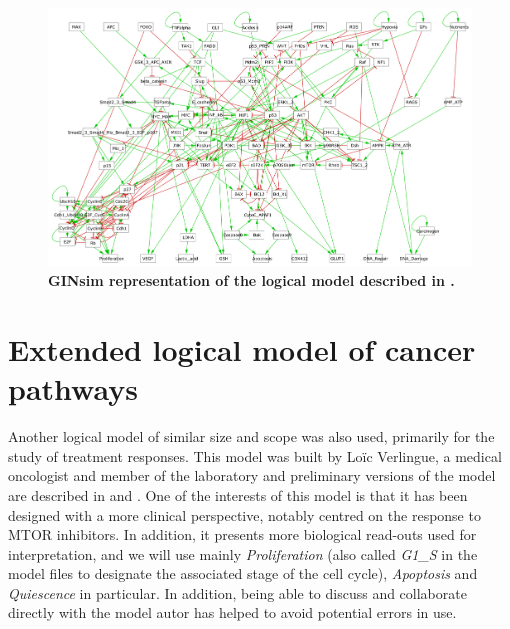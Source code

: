 \documentclass[a4paper,12pt,twoside,onecolumn,openright,final,oldfontcommands]{memoir}
\begin{document}
\begin{figure}

{\centering \includegraphics[width=0.9\linewidth]{fig/Fumia2013} 

}

\caption[GINsim representation of the logical model described in Fumia et al. (2013)]{\textbf{GINsim representation of the logical model
described in \citet{fumia2013boolean}.}}\label{fig:Fumia}
\end{figure}




\section{Extended logical model of cancer
pathways}\label{appendix-verlingue}

Another logical model of similar size and scope was also used, primarily
for the study of treatment responses. This model was built by Loïc
Verlingue, a medical oncologist and member of the laboratory and
preliminary versions of the model are described in
\citet{verlingue2016comprehensive} and \citet{verlingue2016silico}. One
of the interests of this model is that it has been designed with a more
clinical perspective, notably centred on the response to MTOR
inhibitors. In addition, it presents more biological read-outs used for
interpretation, and we will use mainly \emph{Proliferation} (also called
\emph{G1\_S} in the model files to designate the associated stage of the
cell cycle), \emph{Apoptosis} and \emph{Quiescence} in particular. In
addition, being able to discuss and collaborate directly with the model
autor has helped to avoid potential errors in use.
\end{document}
